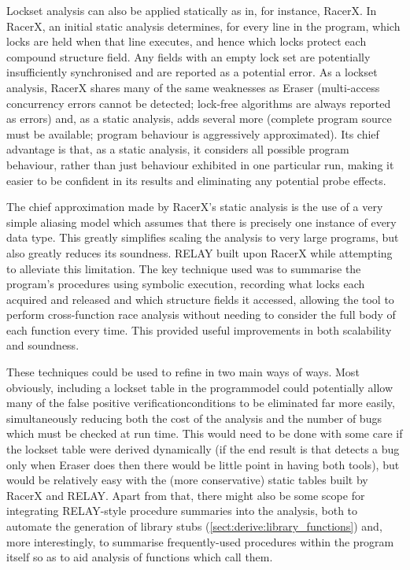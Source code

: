 Lockset analysis can also be applied statically as in, for instance,
RacerX\cite{Engler2003}.  In RacerX, an initial static analysis
determines, for every line in the program, which locks are held when
that line executes, and hence which locks protect each compound
structure field.  Any fields with an empty lock set are potentially
insufficiently synchronised and are reported as a potential error.  As
a lockset analysis, RacerX shares many of the same weaknesses as
Eraser (multi-access concurrency errors cannot be detected; lock-free
algorithms are always reported as errors) and, as a static analysis,
adds several more (complete program source must be available; program
behaviour is aggressively approximated).  Its chief advantage is that,
as a static analysis, it considers all possible program behaviour,
rather than just behaviour exhibited in one particular run, making it
easier to be confident in its results and eliminating any potential
probe effects.

The chief approximation made by RacerX's static analysis is the use of
a very simple aliasing model which assumes that there is precisely one
instance of every data type.  This greatly simplifies scaling the
analysis to very large programs, but also greatly reduces its
soundness.  RELAY\cite{Voung2007} built upon RacerX while attempting
to alleviate this limitation.  The key technique used was to summarise
the program's procedures\cite{Qadeer2004} using symbolic execution,
recording what locks each acquired and released and which structure
fields it accessed, allowing the tool to perform cross-function race
analysis without needing to consider the full body of each function
every time.  This provided useful improvements in both scalability and
soundness.

These techniques could be used to refine {\technique} in two main ways
of ways.  Most obviously, including a lockset table in the
\gls{programmodel} could potentially allow many of the false positive
\glspl{verificationcondition} to be eliminated far more easily,
simultaneously reducing both the cost of the analysis and the number
of bugs which must be checked at run time.  This would need to be done
with some care if the lockset table were derived dynamically (if the
end result is that {\technique} detects a bug only when Eraser does
then there would be little point in having both tools), but would be
relatively easy with the (more conservative) static tables built by
RacerX and RELAY.  Apart from that, there might also be some scope for
integrating RELAY-style procedure summaries into the {\technique}
analysis, both to automate the generation of library stubs
(\autoref{sect:derive:library_functions}) and, more interestingly, to
summarise frequently-used procedures within the program itself so as
to aid analysis of functions which call them.

